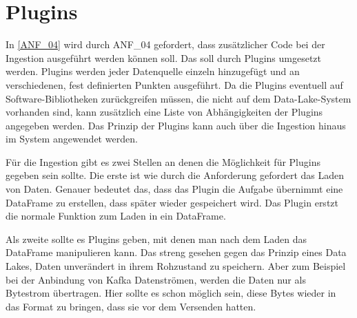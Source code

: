 \section{Plugins}

In \ref{ANF_04} wird durch ANF\_04 gefordert, dass zusätzlicher Code bei der Ingestion ausgeführt werden können soll.
Das soll durch Plugins umgesetzt werden.
Plugins werden jeder Datenquelle einzeln hinzugefügt und an verschiedenen, fest definierten Punkten ausgeführt.
Da die Plugins eventuell auf Software-Bibliotheken zurückgreifen müssen, die nicht auf dem Data-Lake-System vorhanden sind, kann zusätzlich eine Liste von Abhängigkeiten der Plugins angegeben werden.
Das Prinzip der Plugins kann auch über die Ingestion hinaus im System angewendet werden.

Für die Ingestion gibt es zwei Stellen an denen die Möglichkeit für Plugins gegeben sein sollte.
Die erste ist wie durch die Anforderung gefordert das Laden von Daten.
Genauer bedeutet das, dass das Plugin die Aufgabe übernimmt eine DataFrame zu erstellen, dass später wieder gespeichert wird.
Das Plugin erstzt die normale Funktion zum Laden in ein DataFrame.

Als zweite sollte es Plugins geben, mit denen man nach dem Laden das DataFrame manipulieren kann.
Das streng gesehen gegen das Prinzip eines Data Lakes, Daten unverändert in ihrem Rohzustand zu speichern.
Aber zum Beispiel bei der Anbindung von Kafka Datenströmen, werden die Daten nur als Bytestrom übertragen.
Hier sollte es schon möglich sein, diese Bytes wieder in das Format zu bringen, dass sie vor dem Versenden hatten.